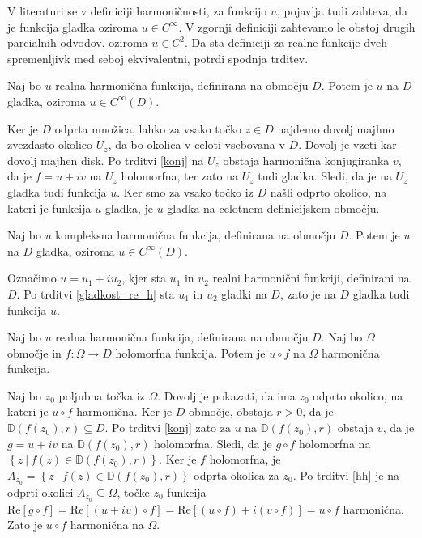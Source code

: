 \documentclass[mat1, tisk]{fmfdelo}
\begin{document}
    \begin{opomba}
        V literaturi se v definiciji harmoničnosti, za funkcijo $u$, pojavlja tudi zahteva, da je funkcija gladka oziroma $u \in C^{\infty}$. V zgornji definiciji zahtevamo le obstoj drugih parcialnih odvodov, oziroma $u \in C^2$. 
        Da sta definiciji za realne funkcije dveh spremenljivk med seboj ekvivalentni, potrdi spodnja trditev. 
    \end{opomba}
    \begin{trditev}
        \label{gladkost_re_h}
        Naj bo $u$ realna harmonična funkcija, definirana na območju $D$. Potem je $u$ na $D$ gladka, oziroma $u \in C^{\infty}(D)$. 
    \end{trditev}
    \begin{dokaz}
        Ker je  $D$ odprta množica, lahko za vsako točko $z \in D$ najdemo dovolj majhno zvezdasto okolico $U_z$, da bo okolica v celoti vsebovana v $D$. Dovolj je vzeti kar dovolj majhen disk. 
        Po trditvi \ref{konj} na $U_z$ obstaja harmonična konjugiranka $v$, da je $f = u+ iv$ na $U_z$ holomorfna, ter zato na $U_z$ tudi gladka. Sledi, da je na $U_z$ gladka tudi funkcija $u$.
        Ker smo za vsako točko iz $D$ našli odprto okolico, na kateri je funkcija $u$ gladka, je $u$ gladka na celotnem definicijskem območju.
    \end{dokaz}
    \begin{posledica}
        \label{gladkost_komp_h}
        Naj bo $u$ kompleksna harmonična funkcija, definirana na območju $D$. Potem je $u$ na $D$ gladka, oziroma $u \in C^{\infty}(D)$. 
    \end{posledica}
    \begin{dokaz}
        Označimo $u = u_1 + i u_2$, kjer sta $u_1$ in $u_2$ realni harmonični funkciji, definirani na $D$. Po trditvi \ref{gladkost_re_h} sta $u_1$ in $u_2$ gladki na $D$, zato je na $D$ gladka tudi funkcija $u$.
    \end{dokaz}

    \begin{trditev}
        \label{komp_s_hol}
        Naj bo $u$ realna harmonična funkcija, definirana na območju $D$. Naj bo $\Omega$ območje in $f : \Omega \to D$ holomorfna funkcija. Potem je $u \circ f$ na $\Omega$ harmonična funkcija.
    \end{trditev}
    \begin{dokaz}
        Naj bo $z_0$ poljubna točka iz $\Omega$. Dovolj je pokazati, da ima $z_0$ odprto okolico, na kateri je $u \circ f$ harmonična. Ker je $D$ območje, obstaja $r > 0$, da je \mbox{$\mathbb{D}(f(z_0), r) \subseteq D$}. 
        Po trditvi \ref{konj} zato za $u$ na $\mathbb{D}(f(z_0),r)$ obstaja $v$, da je $g = u + iv$ na $\mathbb{D}(f(z_0), r)$ holomorfna. Sledi, da je $g \circ f$ holomorfna na $\left\{z~|~ f(z) \in \mathbb{D}(f(z_0), r)\right\}$.
        Ker je $f$ holomorfna, je $A_{z_0} = \left\{z~|~ f(z) \in \mathbb{D}(f(z_0), r)\right\}$ odprta okolica za $z_0$. Po trditvi \ref{hh} je na odprti okolici $A_{z_0} \subseteq \Omega$, točke $z_0$ funkcija $\text{Re}[g \circ f] = \text{Re}[(u + iv)\circ f] = \text{Re}[(u \circ f) + i(v \circ f)] = u \circ f$ harmonična. 
        Zato je $u \circ f$ harmonična na $\Omega$.
    \end{dokaz}
\end{document}

